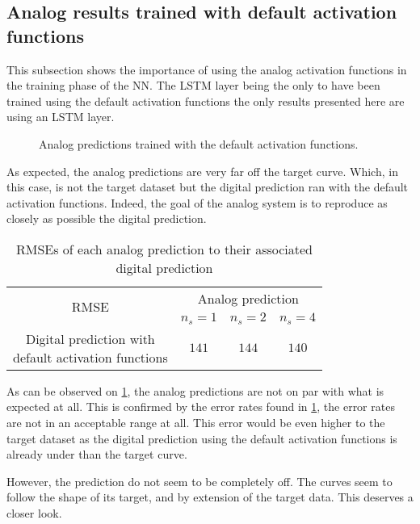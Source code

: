 \subsection{Analog results trained with default activation functions}\label{subsec:airlineAnalogNoC}

This subsection shows the importance of using the analog activation functions in the training phase of the \ac{NN}. The \ac{LSTM} layer being the only to have been trained using the default activation functions the only results presented here are using an \ac{LSTM} layer.

\begin{figure}[H]
  \centering
  
  \caption{Analog predictions trained with the default activation functions.}
  \label{graph:airlineAnalogNoC}
\end{figure}

As expected, the analog predictions are very far off the target curve. Which, in this case, is not the target dataset but the digital prediction ran with the default activation functions. Indeed, the goal of the analog system is to reproduce as closely as possible the digital prediction.

\begin{table}[H]
  \centering
  \begin{tabular}{|c|c|c|c|}
    \hline
    \multirow{2}{*}{\acs{RMSE}} & \multicolumn{3}{c|}{Analog prediction}\\
    \cline{2-4}
    & $n_s=1$ & $n_s=2$ & $n_s=4$ \\
    \hline
    \specialcell{Digital prediction with\\default activation functions} & $141$ & $144$ & $140$\\
    \hline
  \end{tabular}
  \caption{\acp{RMSE} of each analog prediction to their associated digital prediction}
  \label{tab:airlineAnalogNoC}
\end{table}

As can be observed on \cref{graph:airlineAnalogNoC}, the analog predictions are not on par with what is expected at all. This is confirmed by the error rates found in \cref{tab:airlineAnalogNoC}, the error rates are not in an acceptable range at all. This error would be even higher to the target dataset as the digital prediction using the default activation functions is already under than the target curve.

However, the prediction do not seem to be completely off. The curves seem to follow the shape of its target, and by extension of the target data. This deserves a closer look.

